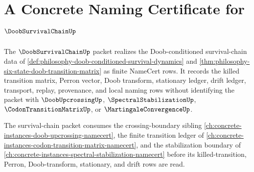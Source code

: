 \chapter{A Concrete Naming Certificate for $\DoobSurvivalChainUp$}
\label{ch:concrete-instances-doob-survival-chain-namecert}

The $\DoobSurvivalChainUp$ packet realizes the Doob-conditioned survival-chain data of \autoref{def:philosophy-doob-conditioned-survival-dynamics} and \autoref{thm:philosophy-six-state-doob-transition-matrix} as finite NameCert rows. It records the killed transition matrix, Perron vector, Doob transform, stationary ledger, drift ledger, transport, replay, provenance, and local naming rows without identifying the packet with $\DoobUpcrossingUp$, $\SpectralStabilizationUp$, $\CodonTransitionMatrixUp$, or $\MartingaleConvergenceUp$.

The survival-chain packet consumes the crossing-boundary sibling \autoref{ch:concrete-instances-doob-upcrossing-namecert}, the finite transition ledger of \autoref{ch:concrete-instances-codon-transition-matrix-namecert}, and the stabilization boundary of \autoref{ch:concrete-instances-spectral-stabilization-namecert} before its killed-transition, Perron, Doob-transform, stationary, and drift rows are read.

